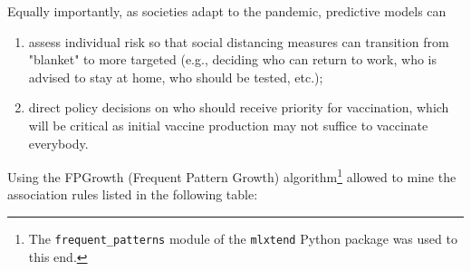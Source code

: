 \documentclass[11pt,a4paper]{article}
\begin{document}
Equally importantly, as societies adapt to the pandemic, predictive models can
\begin{enumerate}
    \item assess individual risk so that social distancing measures can
    transition from "blanket" to more targeted (e.g., deciding who can return to
    work, who is advised to stay at home, who should be tested, etc.);
    \item direct policy decisions on who should receive priority for
    vaccination, which will be critical as initial vaccine production may not
    suffice to vaccinate everybody.
\end{enumerate}
Using the FPGrowth (Frequent Pattern Growth) algorithm\footnote{The
\texttt{frequent\_patterns} module of the \texttt{mlxtend} Python package was
used to this end.} allowed to mine the association rules listed in the following
table:
\end{document}

